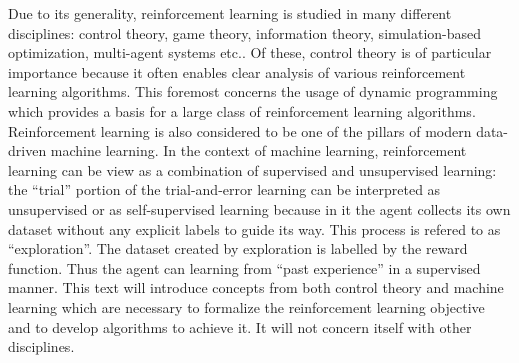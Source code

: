  

Due to its generality, reinforcement learning is studied in many different disciplines: control theory, game theory,
information theory, simulation-based optimization, multi-agent systems etc..
Of these, control theory is of particular importance because it
often enables clear analysis of various reinforcement learning algorithms.
This foremost concerns the usage of dynamic programming which
provides a basis for a large class of reinforcement learning algorithms.
Reinforcement learning is also considered to be one of the pillars of modern data-driven machine learning.
In the context of machine learning, reinforcement learning can be view as a combination of supervised and unsupervised learning:
the ``trial'' portion of the trial-and-error learning can be interpreted as unsupervised or as self-supervised learning
because in it the agent collects its own dataset without any explicit labels to guide its way.
This process is refered to as ``exploration''.
The dataset created by exploration is labelled by the reward function.
Thus the agent can learning from ``past experience'' in a supervised manner.
This text will introduce concepts from both control theory
and machine learning which are necessary to formalize the reinforcement learning objective
and to develop algorithms to achieve it.
It will not concern itself with other disciplines.

